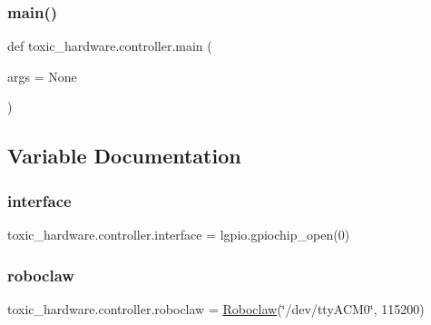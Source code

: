 \subsubsection{\texorpdfstring{main()}{main()}}
{\footnotesize\ttfamily def toxic\+\_\+hardware.\+controller.\+main (\begin{DoxyParamCaption}\item[{}]{args = {\ttfamily None} }\end{DoxyParamCaption})}



\subsection{Variable Documentation}
\mbox{\label{namespacetoxic__hardware_1_1controller_aad059999a7b9fd3d9c1c8d089be1c11d}} 
\subsubsection{\texorpdfstring{interface}{interface}}
{\footnotesize\ttfamily toxic\+\_\+hardware.\+controller.\+interface = lgpio.\+gpiochip\+\_\+open(0)}

\mbox{\label{namespacetoxic__hardware_1_1controller_a04dd192562404771fdbc6d100eaa3566}} 
\subsubsection{\texorpdfstring{roboclaw}{roboclaw}}
{\footnotesize\ttfamily toxic\+\_\+hardware.\+controller.\+roboclaw = \mbox{\hyperlink{classtoxic__hardware_1_1roboclaw__3_1_1Roboclaw}{Roboclaw}}(\char`\"{}/dev/tty\+A\+C\+M0\char`\"{}, 115200)}

